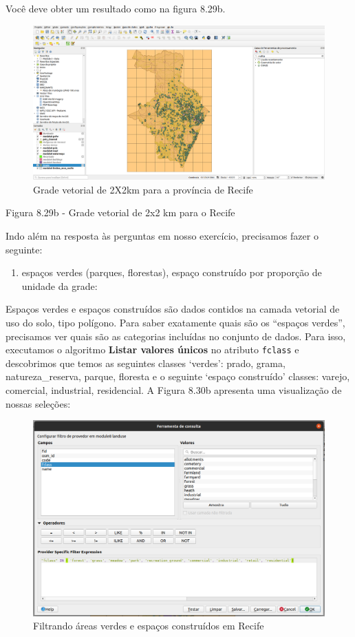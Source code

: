 \documentclass[
  portuguese,
]{krantz}
\providecommand{\tightlist}{%
  \setlength{\itemsep}{0pt}\setlength{\parskip}{0pt}}
\begin{document}
Você deve obter um resultado como na figura 8.29b.

\begin{figure}
\centering
\includegraphics{media/modulo8/fig829_b.png}
\caption{Grade vetorial de 2X2km para a província de Recife}
\end{figure}

Figura 8.29b - Grade vetorial de 2x2 km para o Recife

Indo além na resposta às perguntas em nosso exercício, precisamos fazer o seguinte:

\begin{enumerate}
\def\labelenumi{\arabic{enumi}.}
\tightlist
\item
  espaços verdes (parques, florestas), espaço construído por proporção de unidade da grade:
\end{enumerate}

Espaços verdes e espaços construídos são dados contidos na camada vetorial de uso do solo, tipo polígono. Para saber exatamente quais são os ``espaços verdes'', precisamos ver quais são as categorias incluídas no conjunto de dados. Para isso, executamos o algoritmo \textbf{Listar valores únicos} no atributo \texttt{fclass} e descobrimos que temos as seguintes classes `verdes': prado, grama, natureza\_reserva, parque, floresta e o seguinte `espaço construído' classes: varejo, comercial, industrial, residencial. A Figura 8.30b apresenta uma visualização de nossas seleções:

\begin{figure}
\centering
\includegraphics{media/modulo8/fig830_a.png}
\caption{Filtrando áreas verdes e espaços construídos em Recife}
\end{figure}
\end{document}
